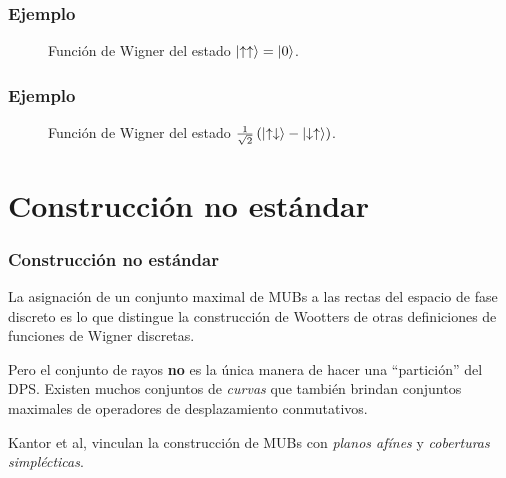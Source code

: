 \documentclass[10pt,spanish]{beamer}
\begin{document}
  \begin{frame}
    \frametitle{Ejemplo}

    \begin{figure}[h]
      \centering
      \scalebox{0.6}{
        
      }
      \caption{Función de Wigner del estado
      $\ket{\uparrow\uparrow} = \ket{0}$.}
      \label{fig:wigner-desargues-2-2-s1}
    \end{figure}
  \end{frame}

  \begin{frame}
    \frametitle{Ejemplo}

    \begin{figure}[h]
      \centering
      \scalebox{0.6}{
        
      }
      \caption{Función de Wigner del estado
      $\frac{1}{\sqrt{2}} \left(
        \ket{\uparrow\downarrow} -
      \ket{\downarrow\uparrow}\right)$.}
      \label{fig:wigner-desargues-2-2-s2}
    \end{figure}
  \end{frame}

  \section{Construcción no estándar}

  \begin{frame}
    \frametitle{Construcción no estándar}

    La asignación de un conjunto maximal de MUBs a las
    rectas del espacio de fase discreto es lo que distingue
    la construcción de Wootters de otras definiciones de
    funciones de Wigner discretas.

    \vspace{15pt}

    \pause

    Pero el conjunto de rayos \textbf{no} es la única manera
    de hacer una ``partición'' del DPS. Existen muchos
    conjuntos de \textit{curvas} que también brindan
    conjuntos maximales de operadores de desplazamiento
    conmutativos.

    \vspace{15pt}

    \pause

    Kantor et al, vinculan la construcción de MUBs con
    \textit{planos afínes} y \textit{coberturas
    simplécticas}.
  \end{frame}
\end{document}
